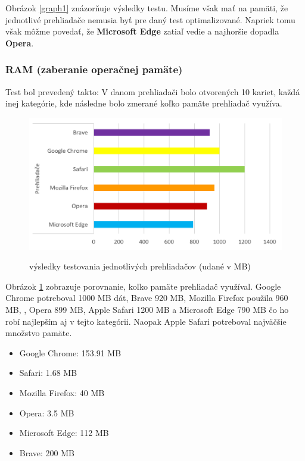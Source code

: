 \documentclass[10pt,Slovak,a4paper]{article}
\begin{document}
\begin{paragraph}
        Obrázok \ref{graph1} znázorňuje výsledky testu. Musíme však mať na pamäti, že jednotlivé prehliadače nemusia byť pre daný test optimalizované. Napriek tomu však môžme povedať, že \textbf{ Microsoft Edge} zatiaľ vedie a najhoršie dopadla \textbf{Opera}.
        \cite{browser_comparison}
    \end{paragraph}

        
    \subsubsection{RAM (zaberanie operačnej pamäte)}
    \begin{paragraph}
        Test bol prevedený takto: V danom prehliadači bolo otvorených 10 kariet, každá inej kategórie, kde následne bolo zmerané koľko pamäte prehliadač využíva.

        \begin{figure}[h]
            \centering
            \includegraphics[scale=.7]{graph2.png}
            \cite{graph2}
            \caption{výsledky testovania jednotlivých prehliadačov (udané v MB)}
            \label{graph2}
        \end{figure}  
        
        Obrázok \ref{graph2} zobrazuje porovnanie, koľko pamäte prehliadač využíval. Google Chrome potreboval 1000 MB dát, Brave 920 MB, Mozilla Firefox použila 960 MB, , Opera 899 MB, Apple Safari 1200 MB a Microsoft Edge 790 MB čo ho robí najlepším aj v tejto kategórii. Naopak Apple Safari potreboval najväčšie množstvo pamäte.
        \cite{browser_compare_ram}


        \begin{itemize}
          \item Google Chrome: 153.91 MB
          \item Safari: 1.68 MB
          \item Mozilla Firefox: 40 MB
          \item Opera: 3.5 MB
          \item Microsoft Edge: 112 MB
          \item Brave: 200 MB
        \end{itemize}


\end{paragraph}
\end{document}
